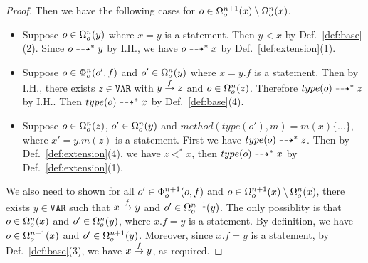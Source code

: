 \documentclass{llncs}
\newcommand\Var{\mathtt{VAR}}
\begin{document}
\begin{proof}
Then we have the following cases for $o\in\Omega^{n+1}_o(x)\setminus\Omega^n_o(x)$.
\begin{itemize}
\item Suppose $o\in\Omega^n_o(y)$ where $x=y$ is a statement. Then $y\less x$ by Def.~\ref{def:base}(2). Since $o\dashrightarrow^*y$ by I.H.,
      we have $o\dashrightarrow^*x$ by Def.~\ref{def:extension}(1).
\item Suppose $o\in\Phi^n_o(o',f)$ and $o'\in\Omega^n_o(y)$ where $x=y.f$ is a statement. Then by I.H., there exists $z\in\Var$
      with $y\stackrel{f}{\rightarrow}z$ and $o\in\Omega^n_o(z)$. Therefore $type(o)\dashrightarrow^*z$ by I.H.. Then $type(o)\dashrightarrow^*x$ by Def.~\ref{def:base}(4).
\item Suppose $o\in\Omega^n_o(z)$, $o'\in\Omega^n_o(y)$ and $method(type(o'),m)=m(x)\{\dots\}$, where $x'=y.m(z)$ is a statement.
      First we have $type(o)\dashrightarrow^* z$. Then by Def.~\ref{def:extension}(4), we have $z\less^* x$, then $type(o)\dashrightarrow^* x$ by Def.~\ref{def:extension}(1).
\end{itemize}

We also need to shown for all $o'\in\Phi^{n+1}_o(o,f)$ and $o\in\Omega^{n+1}_o(x)\setminus\Omega^{n}_o(x)$, there exists $y\in\Var$ 
such that $x\stackrel{f}{\rightarrow}y$ and $o'\in\Omega^{n+1}_o(y)$. The only possiblity is that $o\in\Omega^n_o(x)$ and $o'\in\Omega^n_o(y)$, where $x.f=y$ is a statement.
By definition, we have $o\in\Omega^{n+1}_o(x)$ and $o'\in\Omega^{n+1}_o(y)$. Moreover, since $x.f=y$ is a statement, 
by Def.~\ref{def:base}(3), we have $x\stackrel{f}{\rightarrow}y$, as required.


\end{proof}
\end{document}
